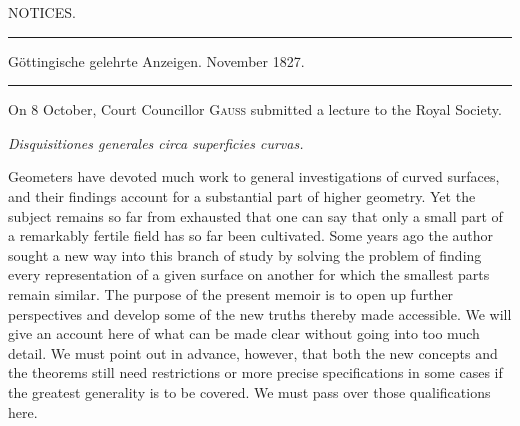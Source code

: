 \begin{center}
\Large NOTICES.\par\medskip
\normalsize\rule{.85\textwidth}{.3pt}\par
Göttingische gelehrte Anzeigen. November 1827.\par
\rule{.85\textwidth}{.3pt}
\end{center}
\hspace*{\parindent}On 8 October, Court Councillor \textsc{Gauss} submitted a lecture to the Royal Society.
\begin{center}\textit{Disquisitiones generales circa superficies curvas.}\end{center}
\hspace*{\parindent}Geometers have devoted much work to general investigations of curved surfaces, and their findings account for a substantial part of higher geometry. Yet the subject remains so far from exhausted that one can say that only a small part of a remarkably fertile field has so far been cultivated. Some years ago the author sought a new way into this branch of study by solving the problem of finding every representation of a given surface on another for which the smallest parts remain similar. The purpose of the present memoir is to open up further perspectives and develop some of the new truths thereby made accessible. We will give an account here of what can be made clear without going into too much detail. We must point out in advance, however, that both the new concepts and the theorems still need restrictions or more precise specifications in some cases if the greatest generality is to be covered. We must pass over those qualifications here.
